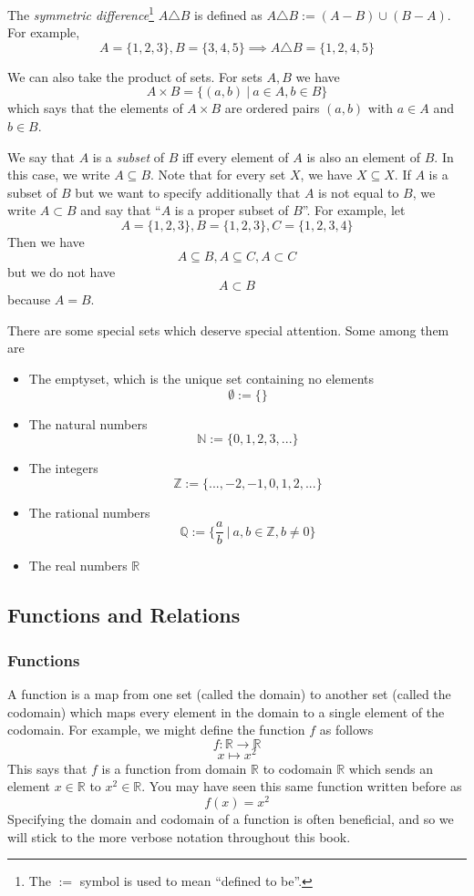 The \emph{symmetric difference}\footnote{The $:=$ symbol is used to mean ``defined to be''.} $A \triangle B$ is defined as $A \triangle B := (A-B)\cup(B-A)$. For example, 
\[
  A = \{1, 2, 3\}, B = \{3, 4, 5\} \implies A \triangle B = \{1, 2, 4, 5\}
\]

We can also take the product of sets. For sets $A, B$ we have
\[
  A \times B = \{(a, b)\ |\ a \in A, b \in B \}
\]
which says that the elements of $A \times B$ are ordered pairs $(a, b)$ with $a \in A$ and $b \in B$. 

We say that $A$ is a \emph{subset} of $B$ iff every element of $A$ is also an element of $B$. In this case, we write $A \subseteq B$. Note that for every set $X$, we have $X \subseteq X$. If $A$ is a subset of $B$ but we want to specify additionally that $A$ is not equal to $B$, we write $A \subset B$ and say that ``$A$ is a proper subset of $B$''. For example, let
\[
  A = \{1, 2, 3\}, B = \{1, 2, 3\}, C = \{1, 2, 3, 4\}
\]
Then we have
\[
  A \subseteq B, A \subseteq C, A \subset C
\]
but we do not have
\[
  A \subset B
\]
because $A = B$. 

There are some special sets which deserve special attention. Some among them are
\begin{itemize}
  \item The emptyset, which is the unique set containing no elements
  \[
    \emptyset := \{\}
  \]
  \item The natural numbers
  \[
    \mathbb{N} := \{0, 1, 2, 3,...\}
  \]
  \item The integers
  \[
    \mathbb{Z} := \{...,-2,-1,0,1,2,...\}
  \]
  \item The rational numbers
  \[
    \mathbb{Q} := \{\frac{a}{b}\ |\ a, b \in \mathbb{Z}, b \neq 0\}
  \]
  \item The real numbers $\mathbb{R}$
\end{itemize}

\subsection{Functions and Relations}
\subsubsection*{Functions}
A function is a map from one set (called the domain) to another set (called the codomain) which maps every element in the domain to a single element of the codomain. For example, we might define the function $f$ as follows
\[
  f : \mathbb{R} \rightarrow \mathbb{R}
\]
\[
  x \mapsto x^2
\]
This says that $f$ is a function from domain $\mathbb{R}$ to codomain $\mathbb{R}$ which sends an element $x \in \mathbb{R}$ to $x^2 \in \mathbb{R}$. You may have seen this same function written before as 
\[
  f(x) = x^2
\]
Specifying the domain and codomain of a function is often beneficial, and so we will stick to the more verbose notation throughout this book. 

